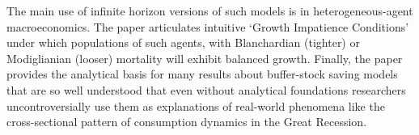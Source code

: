 \documentclass[BufferStockTheory]{subfiles}
\begin{document}
The main use of infinite horizon versions of such models is in heterogeneous-agent macroeconomics. The paper articulates intuitive `Growth Impatience Conditions' under which populations of such agents, with Blanchardian (tighter) or Modiglianian (looser) mortality will exhibit balanced growth.  Finally, the paper provides the analytical basis for many results about buffer-stock saving models that are so well understood that even without analytical foundations researchers uncontroversially use them as explanations of real-world phenomena like the cross-sectional pattern of consumption dynamics in the Great Recession.





\onlyinsubfile{}
\end{document}
